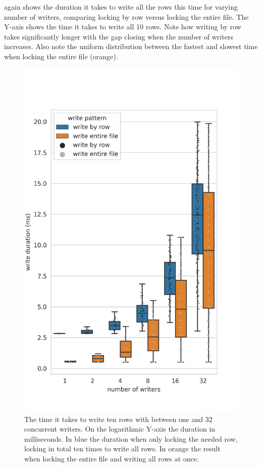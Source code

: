  again shows the duration it takes to write all the rows this time for varying number of writers, comparing locking by row versus locking the entire file. The Y-axis shows the time it takes to write all 10 rows. Note how writing by row takes significantly longer with the gap closing when the number of writers increases. Also note the uniform distribution between the fastest and slowest time when locking the entire file (orange).
%
\begin{figure}[htbp]
	\centering
	\includegraphics[height=\textheight]{../results/plots/range_vs_writers_both.png}
	\caption{The time it takes to write ten rows with between one and 32 concurrent writers. On the logarithmic Y-axis the duration in milliseconds. In blue the duration when only locking the needed row, locking in total ten times to write all rows. In orange the result when locking the entire file and writing all rows at once.}
	\label{fig:writers}
\end{figure}

\clearpage

